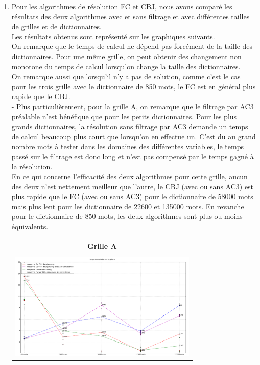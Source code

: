 \documentclass[a4paper,12pt]{report}
\begin{document}
\begin{enumerate}
\newpage
~~\\
~~\\
~~\\
\item Pour les algorithmes de résolution FC et CBJ, nous avons comparé les résultats des deux algorithmes avec et sans filtrage et avec différentes tailles de grilles et de dictionnaires.\\
Les résultats obtenus sont représenté sur les graphiques suivants.\\

On remarque que le temps de calcul ne dépend pas forcément de la taille des dictionnaires. Pour une même grille, on peut obtenir des changement non monotone du temps de calcul lorsqu'on change la taille des dictionnaires.\\

On remarque aussi que lorsqu'il n'y a pas de solution, comme c'est le cas pour les trois grille avec le dictionnaire de 850 mots, le FC est en général plus rapide que le CBJ.\\

- Plus particulièrement, pour la grille A, on remarque que le filtrage par AC3 préalable n'est bénéfique que pour les petits dictionnaires. Pour les plus grands dictionnaires, la résolution sans filtrage par AC3 demande un temps de calcul beaucoup plus court que lorsqu'on en effectue un. C'est du au grand nombre mots à tester dans les domaines des différentes variables, le temps passé sur le filtrage est donc long et n'est pas compensé par le temps gagné à la résolution.\\

En ce qui concerne l'efficacité des deux algorithmes pour cette grille, aucun des deux n'est nettement meilleur que l'autre, le CBJ (avec ou sans AC3) est plus rapide que le FC (avec ou sans AC3) pour le dictionnaire de 58000 mots mais plus lent pour les dictionnaire de 22600 et 135000 mots. En revanche pour le dictionnaire de 850 mots, les deux algorithmes sont plus ou moins équivalents.


\begin{table}[!h]
\begin{center}
\begin{tabular}{|c|}

\hline
  Grille A\\
\hline   
   \\
\includegraphics[width=9cm]{Grille_A.png}  \\
\hline



\end{tabular}
\end{center}
\end{table}
\end{enumerate}
\end{document}
